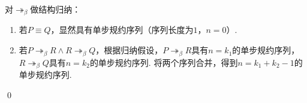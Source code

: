  \label{3.7}
\begin{pf} \rm 
    对$\twoheadrightarrow_\beta$做结构归纳：
    \begin{enumerate}
        \item 若$P\equiv Q$，显然具有单步规约序列（序列长度为$1$，$n=0$）.
        \item 若$P\twoheadrightarrow_\beta R \wedge R\twoheadrightarrow_\beta Q$，根据归纳假设，$P\twoheadrightarrow_\beta R$具有$n=k_1$的单步规约序列，$R\twoheadrightarrow_\beta Q$具有$n=k_2$的单步规约序列. 将两个序列合并，得到$n=k_1+k_2-1$的单步规约序列.
    \end{enumerate}
    \qed
\end{pf}